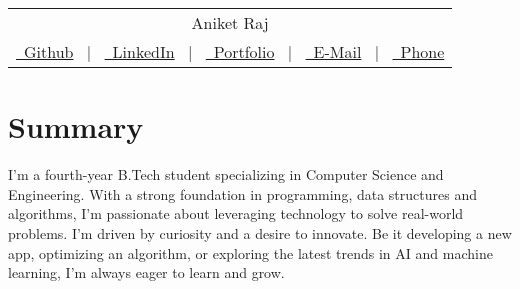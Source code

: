 \documentclass[a4paper,12pt]{article}
\begin{document}
\pagestyle{empty}



\begin{tabularx}{\linewidth}{@{} C @{}}
	\Huge{Aniket Raj}                                                  \\[7.5pt]
	\href{https://github.com/theaniketraj}{\raisebox{-0.05\height}\faGithub\ Github} \ $|$ \
	\href{https://linkedin.com/in/theaniketraj}{\raisebox{-0.05\height}\faLinkedin\ LinkedIn} \ $|$ \
	\href{https://theaniketraj.netlify.app}{\raisebox{-0.05\height}\faGlobe \ Portfolio} \ $|$ \
	\href{mailto:theaniketraj@hotmail.com}{\raisebox{-0.05\height}\faEnvelope \ E-Mail} \ $|$ \
	\href{tel:+919508826151}{\raisebox{-0.05\height}\faMobile \ Phone} \\
\end{tabularx}


\section{Summary}
I’m a fourth-year B.Tech student specializing in Computer Science and Engineering. With a strong foundation in programming, data structures and algorithms, I’m passionate about leveraging technology to solve real-world problems. I’m driven by curiosity and a desire to innovate. Be it developing a new app, optimizing an algorithm, or exploring the latest trends in AI and machine learning, I’m always eager to learn and grow.

\end{document}
